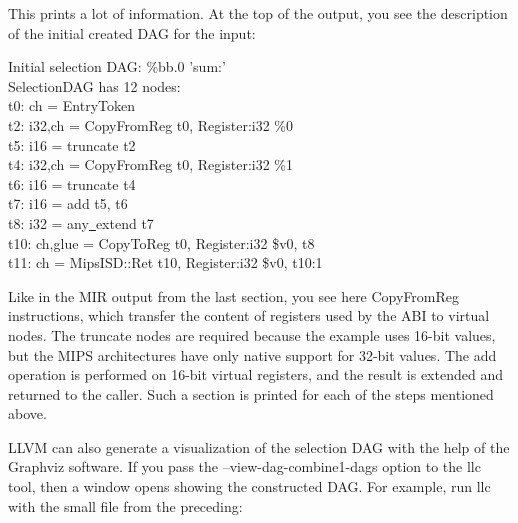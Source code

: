 This prints a lot of information. At the top of the output, you see the description of the initial created DAG for the input:\par

\begin{tcolorbox}[colback=white,colframe=black]
Initial selection DAG: \%bb.0 'sum:' \\
SelectionDAG has 12 nodes: \\
\hspace*{0.5cm}t0: ch = EntryToken \\
\hspace*{2.5cm}t2: i32,ch = CopyFromReg t0, Register:i32 \%0 \\
\hspace*{2cm}t5: i16 = truncate t2 \\
\hspace*{2.5cm}t4: i32,ch = CopyFromReg t0, Register:i32 \%1 \\
\hspace*{2cm}t6: i16 = truncate t4 \\
\hspace*{1.5cm}t7: i16 = add t5, t6 \\
\hspace*{1cm}t8: i32 = any\underline{~}extend t7 \\
\hspace*{0.5cm}t10: ch,glue = CopyToReg t0, Register:i32 \$v0, t8 \\
\hspace*{0.5cm}t11: ch = MipsISD::Ret t10, Register:i32 \$v0, t10:1 
\end{tcolorbox}

Like in the MIR output from the last section, you see here CopyFromReg instructions, which transfer the content of registers used by the ABI to virtual nodes. The truncate nodes are required because the example uses 16-bit values, but the MIPS architectures have only native support for 32-bit values. The add operation is performed on 16-bit virtual registers, and the result is extended and returned to the caller. Such a section is  printed for each of the steps mentioned above.\par

LLVM can also generate a visualization of the selection DAG with the help of the Graphviz software. If you pass the –view-dag-combine1-dags option to the llc tool, then a window opens showing the constructed DAG. For example, run llc with the small file from the preceding:\par

